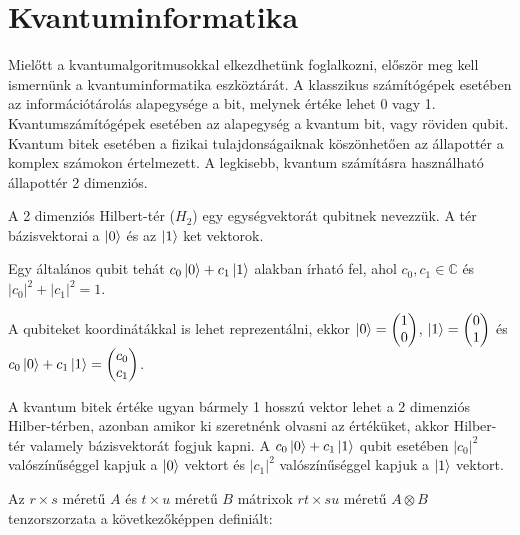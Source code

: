 \chapter{Kvantuminformatika}

Mielőtt a kvantumalgoritmusokkal elkezdhetünk foglalkozni, először meg kell ismernünk
a kvantuminformatika eszköztárát. A klasszikus számítógépek esetében az információtárolás
alapegysége a bit, melynek értéke lehet 0 vagy 1. Kvantumszámítógépek esetében az alapegység a kvantum bit, vagy röviden qubit. Kvantum bitek esetében a fizikai
tulajdonságaiknak köszönhetően az állapottér a komplex számokon értelmezett.
A legkisebb, kvantum számításra használható állapottér 2 dimenziós.

 A 2 dimenziós Hilbert-tér ($H_2$) egy egységvektorát
qubitnek nevezzük. A tér bázisvektorai a $\ket{0}$ és az $\ket{1}$ ket vektorok.

Egy általános qubit tehát $c_0\ket{0} + c_1\ket{1}$ alakban írható fel, ahol
$c_0, c_1 \in{} \mathds{C}$ és $|c_0|^2 + |c_1|^2 = 1$.

 A qubiteket koordinátákkal is lehet
reprezentálni, ekkor $\ket{0} = \begin{pmatrix} 1 \\ 0 \end{pmatrix}$,
$\ket{1} = \begin{pmatrix} 0 \\ 1 \end{pmatrix}$ és $c_0\ket{0} + c_1\ket{1} =
  \begin{pmatrix} c_0 \\ c_1 \end{pmatrix}$.

 A kvantum bitek értéke ugyan bármely 1 hosszú vektor
lehet a 2 dimenziós Hilber-térben, azonban amikor ki szeretnénk olvasni az értéküket,
akkor Hilber-tér valamely bázisvektorát fogjuk kapni. A $c_0\ket{0} + c_1\ket{1}$
qubit esetében $|c_0|^2$ valószínűséggel kapjuk a $\ket{0}$ vektort és $|c_1|^2$
valószínűséggel kapjuk a $\ket{1}$ vektort.

 Az $r \times s$ méretű $A$ és $t \times u$
méretű $B$ mátrixok $rt \times su$ méretű $A \otimes B$ tenzorszorzata a
következőképpen definiált:

